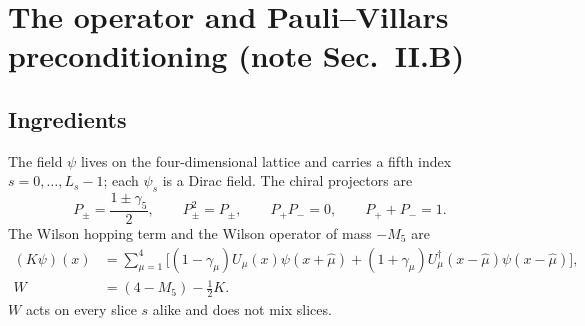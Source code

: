 \documentclass[11pt,a4paper]{article}
\numberwithin{equation}{section}
\newcommand{\dg}{^{\dagger}}
\begin{document}
\section{The operator and Pauli--Villars preconditioning (note Sec.~II.B)}

\subsection{Ingredients}
\label{sec:ingr}
The field $\psi$ lives on the four-dimensional lattice and carries a fifth index
$s=0,\dots,L_s-1$; each $\psi_s$ is a Dirac field. The chiral projectors are
\begin{equation}
P_\pm=\frac{1\pm\gamma_5}{2},\qquad P_\pm^2=P_\pm,\qquad P_+P_-=0,\qquad P_++P_-=1 .
\end{equation}
The Wilson hopping term and the Wilson operator of mass $-M_5$ are
\begin{align}
(K\psi)(x)&=\sum_{\mu=1}^{4}\Big[(1-\gamma_\mu)U_\mu(x)\psi(x+\hat\mu)
+(1+\gamma_\mu)U_\mu\dg(x-\hat\mu)\psi(x-\hat\mu)\Big],\nonumber\\
W&=(4-M_5)-\tfrac12K .
\end{align}
$W$ acts on every slice $s$ alike and does not mix slices.
\end{document}
